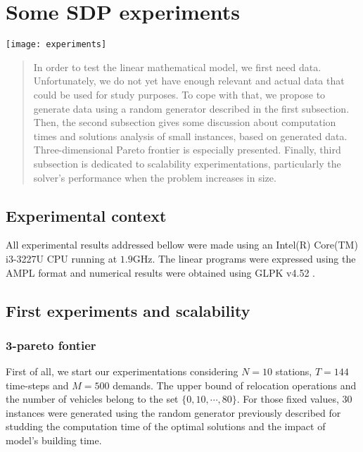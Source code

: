 \chapter{Some SDP experiments} \label{chap:sdpExp}
\begin{bibunit}[ieeetr]
\minitoc
\vspace{2cm}

\begin{minipage}[c]{0.3\linewidth}
\texttt{[image: experiments]}
\end{minipage}
\hfill
\begin{minipage}[c]{0.7\linewidth}
\begin{abstract}
In order to test the linear mathematical model, we first need data.
Unfortunately, we do not yet have enough relevant and actual data that could be used for study purposes.
To cope with that, we propose to generate data using a random generator described in the first subsection.
Then, the second subsection gives some discussion about computation times and solutions analysis of small instances, based on generated data.
Three-dimensional Pareto frontier is especially presented.
Finally, third subsection is dedicated to scalability experimentations, particularly the solver's performance when the problem increases in size.
\end{abstract}
\end{minipage}

\newpage
\section{Experimental context}
All experimental results addressed bellow were made using an Intel(R) Core(TM) i3-3227U CPU running at $1.9$GHz. The linear programs were expressed using the AMPL format \cite{ampl_webPage} and numerical results were obtained using GLPK v4.52 \cite{glpk_webPage}.

\newpage
\section{First experiments and scalability}
\subsection{3-pareto fontier}
First of all, we start our experimentations considering $N=10$ stations, $T=144$ time-steps and $M=500$ demands. The upper bound of relocation operations and the number of vehicles belong to the set $\{0, 10, \cdots, 80\}$. For those fixed values, $30$ instances were generated using the random generator previously described for studding the computation time of the optimal solutions and the impact of model's building time.


\end{bibunit}
